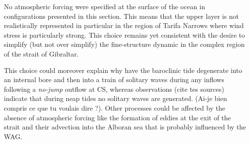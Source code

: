 \color{blue}No atmospheric forcing were specified at the surface of the ocean in configurations presented in this section. This means that the upper layer is not realistically represented in particular in the region of Tarifa Narrows where wind stress is particularly strong. This choice remains yet consistent with the desire to simplify (but not over simplify) the fine-structure dynamic in the complex region of the strait of Gibraltar. \color{black}

This choice could moreover explain why have the baroclinic tide degenerate into an internal bore and then into a train of solitary waves during any inflows following a \textit{no-jump} outflow at CS, whereas observations \color{green}(cite tes sources) \color{black} indicate that during neap tides no solitary waves are generated. \color{green}(Ai-je bien compris ce que tu voulais dire ?). Other processes could be affected \color{blue} by the absence of atmospheric forcing \color{black} like the formation of eddies at the exit of the strait and their advection into \color{blue}the Alboran sea \color{black} that is probably influenced by the WAG.
